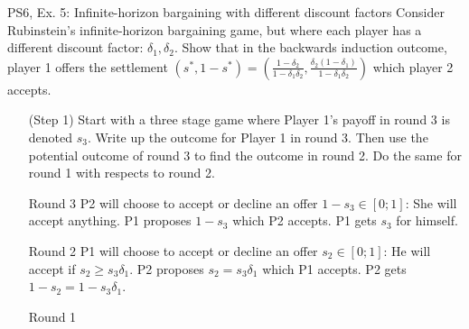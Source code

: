 \begin{frame}{PS6, Ex. 5: Infinite-horizon bargaining with different discount factors}
    Consider Rubinstein's infinite-horizon bargaining game, but where each player has a different discount factor: $\delta_1,\delta_2$. Show that in the backwards induction outcome, player 1 offers the settlement
    $(s^{*},1-s^{*})=\left( \frac{1-\delta_2}{1-\delta_1\delta_2},\frac{\delta_2(1-\delta_1)}{1-\delta_1\delta_2}\right)$
    which player 2 accepts.
    \begin{itemize}
      \item[(Step 1)] Start with a three stage game where Player 1's payoff in round 3 is denoted $s_3$. Write up the outcome for Player 1 in round 3. Then use the potential outcome of round 3 to find the outcome in round 2. Do the same for round 1 with respects to round 2.
    \end{itemize}
    \vfill\null
    \begin{itemize}
        \item[Round 3] P2 will choose to accept or decline an offer $1-s_3\in [0;1]$: She will accept anything. P1 proposes $1-s_3$ which P2 accepts. P1 gets $s_3$ for himself.
        \item[Round 2] P1 will choose to accept or decline an offer $s_2 \in [0;1]$: He will accept if $s_2 \geq s_3\delta_1$. P2 proposes $s_2 = s_3\delta_1$ which P1 accepts. P2 gets $1-s_2 = 1-s_3\delta_1$.
        \item[Round 1]
    \end{itemize}
    \vfill\null
\end{frame}
